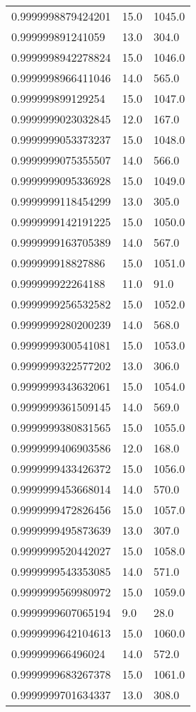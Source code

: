 \begin{center}
\begin{supertabular}[H]{p{0.30\textwidth}p{0.05\textwidth}p{0.05\textwidth}}
0.9999998879424201 & 15.0 & 1045.0 \\ 
0.999999891241059 & 13.0 & 304.0 \\ 
0.9999998942278824 & 15.0 & 1046.0 \\ 
0.9999998966411046 & 14.0 & 565.0 \\ 
0.999999899129254 & 15.0 & 1047.0 \\ 
0.9999999023032845 & 12.0 & 167.0 \\ 
0.9999999053373237 & 15.0 & 1048.0 \\ 
0.9999999075355507 & 14.0 & 566.0 \\ 
0.9999999095336928 & 15.0 & 1049.0 \\ 
0.9999999118454299 & 13.0 & 305.0 \\ 
0.9999999142191225 & 15.0 & 1050.0 \\ 
0.9999999163705389 & 14.0 & 567.0 \\ 
0.999999918827886 & 15.0 & 1051.0 \\ 
0.999999922264188 & 11.0 & 91.0 \\ 
0.9999999256532582 & 15.0 & 1052.0 \\ 
0.9999999280200239 & 14.0 & 568.0 \\ 
0.9999999300541081 & 15.0 & 1053.0 \\ 
0.9999999322577202 & 13.0 & 306.0 \\ 
0.9999999343632061 & 15.0 & 1054.0 \\ 
0.9999999361509145 & 14.0 & 569.0 \\ 
0.9999999380831565 & 15.0 & 1055.0 \\ 
0.9999999406903586 & 12.0 & 168.0 \\ 
0.9999999433426372 & 15.0 & 1056.0 \\ 
0.9999999453668014 & 14.0 & 570.0 \\ 
0.9999999472826456 & 15.0 & 1057.0 \\ 
0.9999999495873639 & 13.0 & 307.0 \\ 
0.9999999520442027 & 15.0 & 1058.0 \\ 
0.9999999543353085 & 14.0 & 571.0 \\ 
0.9999999569980972 & 15.0 & 1059.0 \\ 
0.9999999607065194 & 9.0 & 28.0 \\ 
0.9999999642104613 & 15.0 & 1060.0 \\ 
0.999999966496024 & 14.0 & 572.0 \\ 
0.9999999683267378 & 15.0 & 1061.0 \\ 
0.9999999701634337 & 13.0 & 308.0 \\ 

\end{supertabular}
\end{center}
